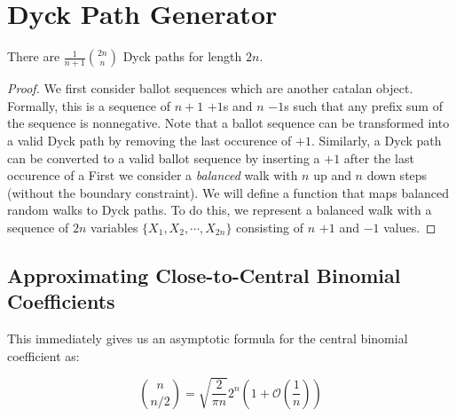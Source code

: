 \section{Dyck Path Generator}%
\label{sec:dyck_appendix}

\begin{theorem}
\label{thm:number_of_dyck_paths}
There are $\frac{1}{n+1}\binom{2n}{n}$ Dyck paths for length $2n$.
\end{theorem}
\begin{proof}
We first consider ballot sequences which are another catalan object.
Formally, this is a sequence of $n+1$ $+1$s and $n$ $-1$s such that any prefix sum of the sequence is nonnegative.
Note that a ballot sequence can be transformed into a valid Dyck path by removing the last occurence of $+1$.
Similarly, a Dyck path can be converted to a valid ballot sequence by inserting a $+1$ after the last occurence of a 
First we consider a \emph{balanced} walk with $n$ up and $n$ down steps (without the boundary constraint).
We will define a function that maps balanced random walks to Dyck paths.
To do this, we represent a balanced walk with a sequence of $2n$ variables $\{ X_1, X_2,\cdots, X_{2n}\}$ consisting of $n$ $+1$ and $-1$ values.
\end{proof}



\subsection{Approximating Close-to-Central Binomial Coefficients}%
\label{sub:approximating_close_to_central_binomial_coefficients}
This immediately gives us an asymptotic formula for the central binomial coefficient as:
\begin{lemma}
\label{lem:central_binomial_coefficient}
\[
\binom{n}{n/2} = \sqrt{\frac{2}{\pi n}}2^n\left( 1 + \mathcal O\left( \frac 1n\right)\right)
\]
\end{lemma}

